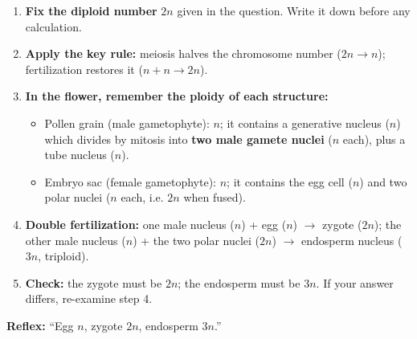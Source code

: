 \documentclass[11pt]{article}
\newcommand{\cle}[1]{{\popxbold\color{popdark}#1}}
\begin{document}
\begin{methode}
\begin{enumerate}
\item \textbf{Fix the diploid number} $2n$ given in the question. Write it down before any calculation.
\item \textbf{Apply the key rule:} \cle{meiosis} halves the chromosome number ($2n \to n$); \cle{fertilization} restores it ($n + n \to 2n$).
\item \textbf{In the flower, remember the ploidy of each structure:}
\begin{itemize}
\item Pollen grain (male gametophyte): $n$; it contains a \cle{generative nucleus} ($n$) which divides by mitosis into \textbf{two male gamete nuclei} ($n$ each), plus a tube nucleus ($n$).
\item Embryo sac (female gametophyte): $n$; it contains the \cle{egg cell} ($n$) and two \cle{polar nuclei} ($n$ each, i.e. $2n$ when fused).
\end{itemize}
\item \textbf{Double fertilization:} one male nucleus ($n$) + egg ($n$) $\to$ \cle{zygote} ($2n$); the other male nucleus ($n$) + the two polar nuclei ($2n$) $\to$ \cle{endosperm nucleus} ($3n$, triploid).
\item \textbf{Check:} the zygote must be $2n$; the endosperm must be $3n$. If your answer differs, re-examine step 4.
\end{enumerate}
\textbf{Reflex:} ``Egg $n$, zygote $2n$, endosperm $3n$.''
\end{methode}
\end{document}
